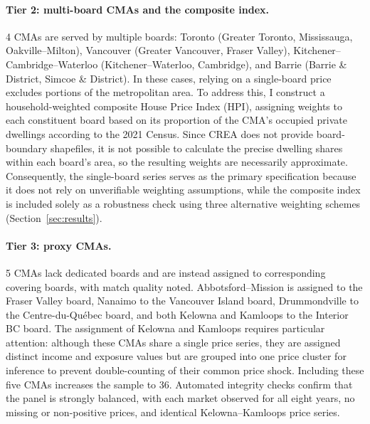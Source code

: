 \documentclass[12pt]{article}
\begin{document}
\paragraph{Tier 2: multi-board CMAs and the composite index.} 4 CMAs are served by multiple boards: Toronto (Greater Toronto, Mississauga, Oakville--Milton), Vancouver (Greater Vancouver, Fraser Valley), Kitchener--Cambridge--Waterloo (Kitchener--Waterloo, Cambridge), and Barrie (Barrie \& District, Simcoe \& District). In these cases, relying on a single-board price excludes portions of the metropolitan area. To address this, I construct a household-weighted composite House Price Index (HPI), assigning weights to each constituent board based on its proportion of the CMA's occupied private dwellings according to the 2021 Census. Since CREA does not provide board-boundary shapefiles, it is not possible to calculate the precise dwelling shares within each board's area, so the resulting weights are necessarily approximate. Consequently, the single-board series serves as the primary specification because it does not rely on unverifiable weighting assumptions, while the composite index is included solely as a robustness check using three alternative weighting schemes (Section~\ref{sec:results}).

\paragraph{Tier 3: proxy CMAs.} 5 CMAs lack dedicated boards and are instead assigned to corresponding covering boards, with match quality noted. Abbotsford--Mission is assigned to the Fraser Valley board, Nanaimo to the Vancouver Island board, Drummondville to the Centre-du-Qu\'ebec board, and both Kelowna and Kamloops to the Interior BC board. The assignment of Kelowna and Kamloops requires particular attention: although these CMAs share a single price series, they are assigned distinct income and exposure values but are grouped into one price cluster for inference to prevent double-counting of their common price shock. Including these five CMAs increases the sample to 36. Automated integrity checks confirm that the panel is strongly balanced, with each market observed for all eight years, no missing or non-positive prices, and identical Kelowna--Kamloops price series.
\end{document}
